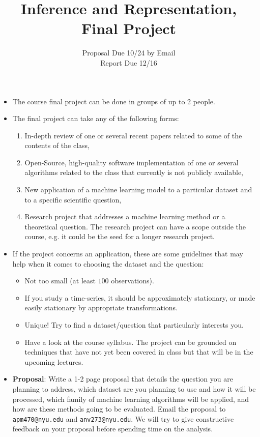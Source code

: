 \documentclass[11pt]{article}
\title{Inference and Representation, Final Project}
\author{Proposal Due 10/24 by Email \\
Report Due 12/16}
\begin{document}
\maketitle

\begin{itemize}
\item The course final project can be done in groups of up to 2 people.

\item The final project can take any of the following forms:
\begin{enumerate}
\item In-depth review of one or several recent papers related to some of the contents of the class,
\item Open-Source, high-quality software implementation of one or several algorithms related to the class that currently is not publicly available,
\item New application of a machine learning model to a particular dataset and to a specific scientific question,
\item Research project that addresses a machine learning method or a theoretical question. The research project can have a scope outside the course, e.g. it could be the seed for a longer research project.
\end{enumerate}


\item If the project concerns an application, these are some guidelines that may help when it comes to choosing the dataset and the question:
\begin{itemize}
\item Not too small (at least $100$ observations).
\item If you study a time-series, it should be approximately stationary, or made easily stationary by appropriate transformations.
\item Unique! Try to find a dataset/question that particularly interests you. 
\item Have a look at the course syllabus. The project can be grounded on techniques that have not yet been covered in class but that will be in the upcoming lectures.
\end{itemize}

\item \textbf{Proposal}: Write a 1-2 page proposal that details the question you are planning to address, which dataset are you planning to use and how it will be processed, which family of machine learning algorithms will be applied, and how are these methods going to be evaluated.  Email the proposal to \texttt{apm470@nyu.edu} and \texttt{anv273@nyu.edu}. We will try to give constructive feedback on your proposal before spending time on the analysis. 
 

\end{itemize}
\end{document}
